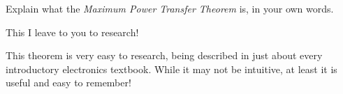 

Explain what the {\it Maximum Power Transfer Theorem} is, in your own words.







This I leave to you to research!


 




This theorem is very easy to research, being described in just about every introductory electronics textbook.  While it may not be intuitive, at least it is useful and easy to remember!




